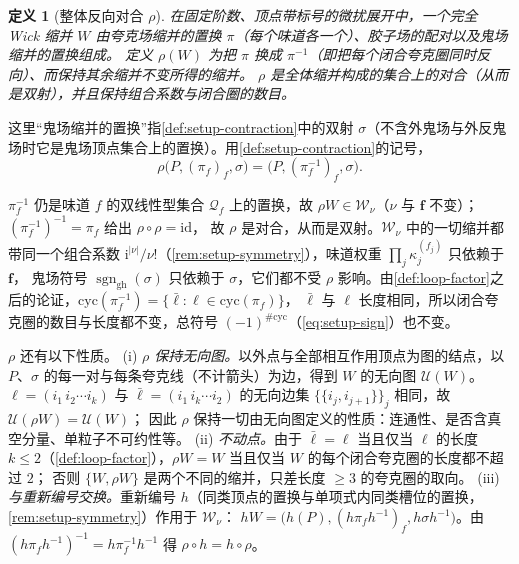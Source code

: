 \documentclass[UTF8,a4paper,11pt,fontset=fandol]{ctexart}
\makeatletter
\theoremstyle{cplain}
\theoremstyle{cdefinition}
\newtheorem{definition}[theorem]{定义}
\theoremstyle{cremark}
\renewcommand{\proofname}{证明}
\renewenvironment{proof}[1][\proofname]{\par\pushQED{\qed}\normalfont\topsep6\p@\@plus6\p@\relax
  \trivlist\item[\hskip\labelsep\itshape #1\hspace{0.5em}]\ignorespaces}{\popQED\endtrivlist\@endpefalse}
\numberwithin{equation}{section}
\newcommand{\ii}{\mathrm{i}}                        %
\makeatother
\begin{document}
\begin{definition}[整体反向对合 $\rho$]\label{def:rho}
在固定阶数、顶点带标号的微扰展开中，一个完全 Wick 缩并 $W$ 由夸克场缩并的置换 $\pi$（每个味道各一个）、胶子场的配对以及鬼场缩并的置换组成。
定义 $\rho(W)$ 为把 $\pi$ 换成 $\pi^{-1}$（即把每个闭合夸克圈同时反向）、而保持其余缩并不变所得的缩并。
$\rho$ 是全体缩并构成的集合上的对合（从而是双射），并且保持组合系数与闭合圈的数目。
\end{definition}

这里“鬼场缩并的置换”指\cref{def:setup-contraction}中的双射 $\sigma$（不含外鬼场与外反鬼场时它是鬼场顶点集合上的置换）。用\cref{def:setup-contraction}的记号，
\begin{equation}\label{eq:thmII-rho}
\rho\bigl(P,(\pi_f)_f,\sigma\bigr)=\bigl(P,(\pi_f^{-1})_f,\sigma\bigr).
\end{equation}

\begin{proof}[定义中断言的证明]
$\pi_f^{-1}$ 仍是味道 $f$ 的双线性型集合 $\mathcal Q_f$ 上的置换，故 $\rho W\in\mathcal W_\nu$（$\nu$ 与 $\boldsymbol f$ 不变）；$(\pi_f^{-1})^{-1}=\pi_f$ 给出 $\rho\circ\rho=\mathrm{id}$，
故 $\rho$ 是对合，从而是双射。$\mathcal W_\nu$ 中的一切缩并都带同一个组合系数 $\ii^{|\nu|}/\nu!$（\cref{rem:setup-symmetry}），味道权重 $\prod_j\kappa_j^{(f_j)}$ 只依赖于 $\boldsymbol f$，
鬼场符号 $\operatorname{sgn}_{\mathrm{gh}}(\sigma)$ 只依赖于 $\sigma$，它们都不受 $\rho$ 影响。由\cref{def:loop-factor}之后的论证，$\mathrm{cyc}(\pi_f^{-1})=\{\bar\ell:\ell\in\mathrm{cyc}(\pi_f)\}$，
$\bar\ell$ 与 $\ell$ 长度相同，所以闭合夸克圈的数目与长度都不变，总符号 $(-1)^{\#\mathrm{cyc}}$（\cref{eq:setup-sign}）也不变。
\end{proof}

$\rho$ 还有以下性质。
(i) \emph{$\rho$ 保持无向图。}以外点与全部相互作用顶点为图的结点，以 $P$、$\sigma$ 的每一对与每条夸克线（不计箭头）为边，得到 $W$ 的无向图 $\mathcal U(W)$。
$\ell=(i_1\,i_2\cdots i_k)$ 与 $\bar\ell=(i_1\,i_k\cdots i_2)$ 的无向边集 $\bigl\{\{i_j,i_{j+1}\}\bigr\}_j$ 相同，故 $\mathcal U(\rho W)=\mathcal U(W)$；
因此 $\rho$ 保持一切由无向图定义的性质：连通性、是否含真空分量、单粒子不可约性等。
(ii) \emph{不动点。}由于 $\bar\ell=\ell$ 当且仅当 $\ell$ 的长度 $k\le2$（\cref{def:loop-factor}），$\rho W=W$ 当且仅当 $W$ 的每个闭合夸克圈的长度都不超过 $2$；
否则 $\{W,\rho W\}$ 是两个不同的缩并，只差长度 $\ge3$ 的夸克圈的取向。
(iii) \emph{与重新编号交换。}重新编号 $h$（同类顶点的置换与单项式内同类槽位的置换，\cref{rem:setup-symmetry}）作用于 $\mathcal W_\nu$：
$hW=\bigl(h(P),(h\pi_fh^{-1})_f,h\sigma h^{-1}\bigr)$。由 $(h\pi_fh^{-1})^{-1}=h\pi_f^{-1}h^{-1}$ 得 $\rho\circ h=h\circ\rho$。
\end{document}
